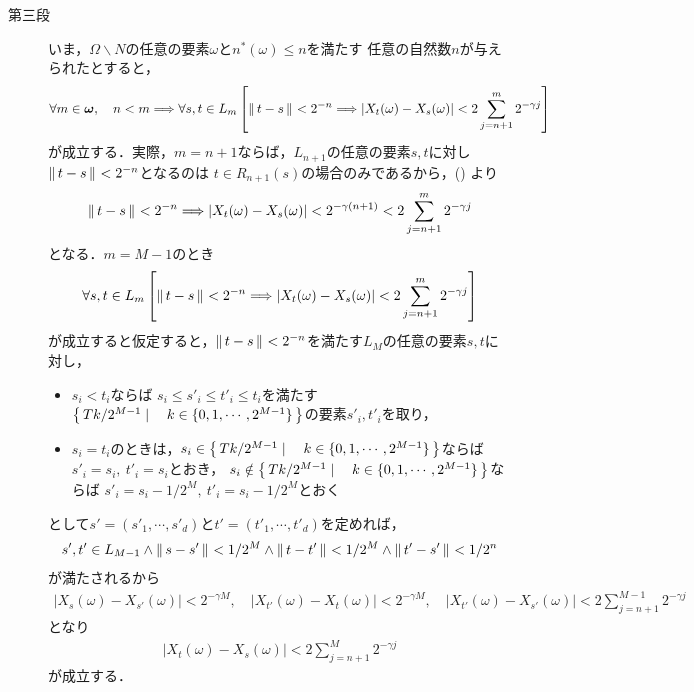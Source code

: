 \begin{prf}
\begin{description}
			\item[第三段]
				いま，$\Omega \backslash N$の任意の要素$\omega$と$n^*(\omega) \leq n$を満たす
				任意の自然数$n$が与えられたとすると，
				\begin{align}
					\forall m \in {\boldsymbol \omega},\quad
					n < m \Longrightarrow \forall s,t \in L_m\left[
					\left\|\, t-s\, \right\|_{} < 2^{-n} \Longrightarrow 
					|X_t(\omega) - X_s(\omega)|<2\sum_{j=n+1}^m 2^{-\gamma j}\right]
				\end{align}
				が成立する．実際，$m=n+1$ならば，$L_{n+1}$の任意の要素$s,t$に対し
				$\left\|\, t-s\, \right\|_{} < 2^{-n}$となるのは
				$t \in R_{n+1}(s)$の場合のみであるから，()
				より
				\begin{align}
					\left\|\, t-s\, \right\|_{} < 2^{-n} \Longrightarrow 
					|X_t(\omega) - X_s(\omega)| < 2^{-\gamma(n+1)}
					< 2\sum_{j=n+1}^m 2^{-\gamma j}
				\end{align}
				となる．$m=M-1$のとき
				\begin{align}
					\forall s,t \in L_m\left[
					\left\|\, t-s\, \right\|_{} < 2^{-n} \Longrightarrow 
					|X_t(\omega) - X_s(\omega)|<2\sum_{j=n+1}^m 2^{-\gamma j}\right]
				\end{align}
				が成立すると仮定すると，$\left\|\, t-s\, \right\|_{} < 2^{-n}$を満たす$L_M$の任意の要素$s,t$に対し，
				\begin{itemize}
					\item $s_i < t_i$ならば
						$s_i \leq s'_i \leq t'_i \leq t_i$を満たす
						$\left\{\, Tk/2^{M-1} \mid \quad k\in\{0,1,\cdots,2^{M-1}\}\, \right\}$の要素$s'_i,t'_i$を取り，
					
					\item $s_i = t_i$のときは，$s_i \in \left\{\, Tk/2^{M-1} \mid \quad k\in\{0,1,\cdots,2^{M-1}\}\, \right\}$ならば
						$s'_i = s_i,\ t'_i = s_i$とおき，
						$s_i \notin \left\{\, Tk/2^{M-1} \mid \quad k\in\{0,1,\cdots,2^{M-1}\}\, \right\}$ならば
						$s'_i = s_i-1/2^M,\ t'_i = s_i-1/2^M$とおく
				\end{itemize}
				として$s'=(s'_1,\cdots,s'_d)$と$t'=(t'_1,\cdots,t'_d)$を定めれば，
				\begin{align}
					s',t' \in L_{M-1}\wedge
					\left\|\, s-s'\, \right\|_{} < 1/2^M \wedge \left\|\, t-t'\, \right\|_{} < 1/2^M
					\wedge \left\|\, t'-s'\, \right\|_{} < 1/2^n
				\end{align}
				が満たされるから
				\begin{align}
					|X_s(\omega) - X_{s'}(\omega)| < 2^{-\gamma M},
					\quad |X_{t'}(\omega) - X_t(\omega)| < 2^{-\gamma M},
					\quad |X_{t'}(\omega) - X_{s'}(\omega)|  < 2\sum_{j=n+1}^{M-1} 2^{-\gamma j}
				\end{align}
				となり
				\begin{align}
					|X_t(\omega) - X_s(\omega)|<2\sum_{j=n+1}^M 2^{-\gamma j}
				\end{align}
				が成立する．
			

\end{description}
\end{prf}
